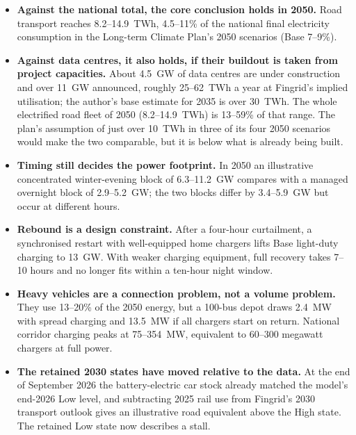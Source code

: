 \documentclass[11pt,a4paper]{article}
\begin{document}
\begin{tcolorbox}[enhanced,colback=panel,colframe=panel,arc=2pt,boxrule=0pt,left=8pt,right=8pt,top=6pt,bottom=6pt,
  title={\textbf{Key findings}},coltitle=black,fonttitle=\small,attach title to upper={\par\vspace{2pt}}]
\small
\begin{itemize}[leftmargin=12pt]
  \item \textbf{Against the national total, the core conclusion holds in 2050.} Road transport reaches 8.2--14.9~TWh, 4.5--11\% of the national final electricity consumption in the Long-term Climate Plan's 2050 scenarios (Base 7--9\%).
  \item \textbf{Against data centres, it also holds, if their buildout is taken from project capacities.} About 4.5~GW of data centres are under construction and over 11~GW announced, roughly 25--62~TWh a year at Fingrid's implied utilisation; the author's base estimate for 2035 is over 30~TWh. The whole electrified road fleet of 2050 (8.2--14.9~TWh) is 13--59\% of that range. The plan's assumption of just over 10~TWh in three of its four 2050 scenarios would make the two comparable, but it is below what is already being built.
  \item \textbf{Timing still decides the power footprint.} In 2050 an illustrative concentrated winter-evening block of 6.3--11.2~GW compares with a managed overnight block of 2.9--5.2~GW; the two blocks differ by 3.4--5.9~GW but occur at different hours.
  \item \textbf{Rebound is a design constraint.} After a four-hour curtailment, a synchronised restart with well-equipped home chargers lifts Base light-duty charging to 13~GW. With weaker charging equipment, full recovery takes 7--10 hours and no longer fits within a ten-hour night window.
  \item \textbf{Heavy vehicles are a connection problem, not a volume problem.} They use 13--20\% of the 2050 energy, but a 100-bus depot draws 2.4~MW with spread charging and 13.5~MW if all chargers start on return. National corridor charging peaks at 75--354~MW, equivalent to 60--300 megawatt chargers at full power.
  \item \textbf{The retained 2030 states have moved relative to the data.} At the end of September 2026 the battery-electric car stock already matched the model's end-2026 Low level, and subtracting 2025 rail use from Fingrid's 2030 transport outlook gives an illustrative road equivalent above the High state. The retained Low state now describes a stall.
\end{itemize}
\end{tcolorbox}
\end{document}
